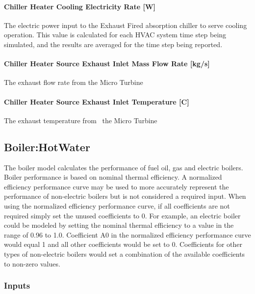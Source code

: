 \paragraph{Chiller Heater Cooling Electricity Rate {[}W{]}}\label{chiller-heater-cooling-electric-power-w-1}

The electric power input to the Exhaust Fired absorption chiller to serve cooling operation. This value is calculated for each HVAC system time step being simulated, and the results are averaged for the time step being reported.

\paragraph{Chiller Heater Source Exhaust Inlet Mass Flow Rate {[}kg/s{]}}\label{chiller-heater-source-exhaust-inlet-mass-flow-rate-kgs}

The exhaust flow rate from the Micro Turbine

\paragraph{Chiller Heater Source Exhaust Inlet Temperature {[}C{]}}\label{chiller-heater-source-exhaust-inlet-temperature-c}

The exhaust temperature from~ the Micro Turbine

\subsection{Boiler:HotWater}\label{boilerhotwater}

The boiler model calculates the performance of fuel oil, gas and electric boilers. Boiler performance is based on nominal thermal efficiency. A normalized efficiency performance curve may be used to more accurately represent the performance of non-electric boilers but is not considered a required input. When using the normalized efficiency performance curve, if all coefficients are not required simply set the unused coefficients to 0. For example, an electric boiler could be modeled by setting the nominal thermal efficiency to a value in the range of 0.96 to 1.0. Coefficient A0 in the normalized efficiency performance curve would equal 1 and all other coefficients would be set to 0. Coefficients for other types of non-electric boilers would set a combination of the available coefficients to non-zero values.

\subsubsection{Inputs}\label{inputs-10-013}

